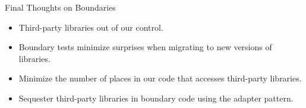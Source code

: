 \documentclass{beamer}
\begin{document}
\begin{frame}[fragile]{Final Thoughts on Boundaries}


\begin{itemize}
\item Third-party libraries out of our control.
\item Boundary tests minimize surprises when migrating to new versions of libraries.
\item Minimize the number of places in our code that accesses third-party libraries.
\item Sequester third-party libraries in boundary code using the adapter pattern.
\end{itemize}


\end{frame}







\end{document}
